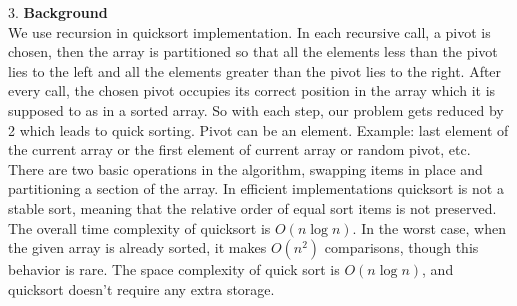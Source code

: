 \documentclass{article}
\begin{document}
3. \textbf{Background} \\
\indent We use recursion in quicksort implementation. In each recursive call, a pivot is chosen, then the array is partitioned so that all the elements less than the pivot lies to the left and all the elements greater than the pivot lies to the right. After every call, the chosen pivot occupies its correct position in the array which it is supposed to as in a sorted array. So with each step, our problem gets reduced by 2 which leads to quick sorting. Pivot can be an element. Example: last element of the current array or the first element of current array or random pivot, etc. \\
\indent There are two basic operations in the algorithm, swapping items in place and partitioning a section of the array. In efficient implementations quicksort is not a stable sort, meaning that the relative order of equal sort items is not preserved. The overall time complexity of quicksort is $O(n\log n)$. In the worst case, when the given array is already sorted, it makes $O(n^2)$ comparisons, though this behavior is rare. The space complexity of quick sort is $O(n\log n)$, and quicksort doesn't require any extra storage. 
\end{document}
